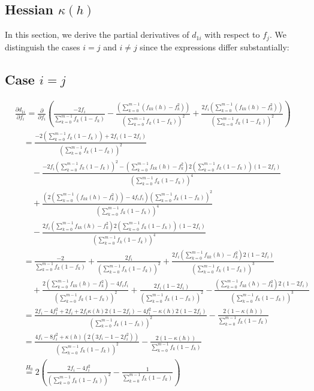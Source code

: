 ﻿\documentclass[12pt,a4paper]{scrreprt}
\theoremstyle{definition}
\begin{document}
\begin{appendices}
\section{Hessian $\kappa(h)$}\label{app:Hessian}
In this section, we derive the partial derivatives of $d_{1i}$ with respect to $f_j$. 
We distinguish the cases $i = j$ and $i \neq j$ since the expressions differ substantially: 

\subsection*{Case $i = j$}
{\allowdisplaybreaks 
\begin{align*}
 & \frac{\partial d_{1i}}{\partial f_i} 
    =  \frac{\partial }{\partial f_i} \left(\frac{-2f_i }{\sum_{k=0}^{m-1}f_k(1-f_k)}- \frac{\left(\sum_{k=0}^{m-1}(f_{kk}(h)-f_k^2)\right)}{\left(\sum_{k=0}^{m-1}f_k(1-f_k)\right)^2} + \frac{2f_i\left(\sum_{k=0}^{m-1}(f_{kk}(h)-f_k^2)\right)}{\left(\sum_{k=0}^{m-1}f_k(1-f_k)\right)^2}\right)\\
    &\quad = \frac{-2 \left(\sum_{k=0}^{m-1}f_k(1-f_k)\right)+ 2f_i(1- 2f_i)}{(\sum_{k=0}^{m-1}f_k(1-f_k))^2} \\
    &\qquad - \frac{-2f_i \left(\sum_{k=0}^{m-1}f_k(1-f_k)\right)^2 - \left(\sum_{k=0}^{m-1}f_{kk}(h)-f_k^2\right)2(\sum_{k=0}^{m-1}f_k(1-f_k))(1-2f_i)}{(\sum_{k=0}^{m-1}f_k(1-f_k))^4}\\
    &\qquad  + \frac{\left(2\left(\sum_{k=0}^{m-1}(f_{kk}(h)-f_k^2)\right) - 4f_i f_i \right)(\sum_{k=0}^{m-1}f_k(1-f_k))^2 }{(\sum_{k=0}^{m-1}f_k(1-f_k))^4} \\
    &\qquad - \frac{ 2f_i\left(\sum_{k=0}^{m-1}f_{kk}(h)-f_k^2\right)2(\sum_{k=0}^{m-1}f_k(1-f_k))(1-2f_i)}{(\sum_{k=0}^{m-1}f_k(1-f_k))^4} \\
    &\quad = \frac{-2}{\sum_{k=0}^{m-1}f_k(1-f_k)}  + \frac{2f_i}{(\sum_{k=0}^{m-1}f_k(1-f_k))^2} + \frac{2f_i\left(\sum_{k=0}^{m-1}f_{kk}(h)-f_k^2\right)2(1-2f_i)}{(\sum_{k=0}^{m-1}f_k(1-f_k))^3} \\
    &\qquad + \frac{2\left(\sum_{k=0}^{m-1}f_{kk}(h)-f_k^2\right) - 4f_i f_i}{(\sum_{k=0}^{m-1}f_k(1-f_k))^2} + \frac{2f_i(1- 2f_i)}{(\sum_{k=0}^{m-1}f_k(1-f_k))^2} - \frac{\left(\sum_{k=0}^{m-1}f_{kk}(h)-f_k^2\right)2(1-2f_i)}{(\sum_{k=0}^{m-1}f_k(1-f_k))^3}  \\
    &\quad = \frac{2f_i - 4f_i^2 + 2f_i + 2f_i\kappa(h)2(1-2f_i) - 4f_i^2 - \kappa(h)2(1-2f_i)}{(\sum_{k=0}^{m-1}f_k(1-f_k))^2} - \frac{2(1- \kappa(h))}{\sum_{k=0}^{m-1}f_k(1-f_k)} \\
    &\quad = \frac{4f_i -8f_i^2+ \kappa (h)(2(3f_i -1 -2 f_i^2))}{(\sum_{k=0}^{m-1}f_k(1-f_k))^2} - \frac{2(1- \kappa(h))}{\sum_{k=0}^{m-1}f_k(1-f_k)}\\
    &\quad \overset{H_0}{=} 2 \left(\frac{2f_i -4f_i^2}{(\sum_{k=0}^{m-1}f_k(1-f_k))^2} -\frac{1}{\sum_{k=0}^{m-1}f_k(1-f_k)}\right)
\end{align*}

}
\end{appendices}
\end{document}
